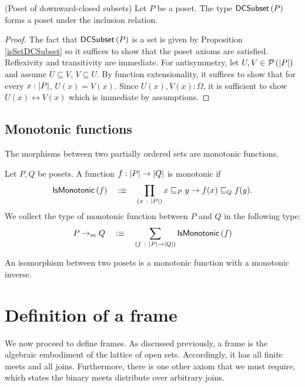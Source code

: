 \begin{thm}(Poset of downward-closed subsets)
  Let $P$ be a poset. The type $\mathsf{DCSubset}{}\left(P\right)$ forms a poset under the
  inclusion relation.
\end{thm}
\begin{proof}
  The fact that $\mathsf{DCSubset}{}\left(P\right)$ is a set is given by
  Proposition \ref{isSetDCSubset} so it suffices to show that the poset axioms are
  satisfied. Reflexivity and transitivity are immediate. For antisymmetry, let $U,
  V \in \mathcal{P}\left(\left| P \right|\right)$ and assume $U \subseteq V$, $V \subseteq U$. By function extensionality, it suffices
  to show that for every $x : \left| P \right|$, $U(x) = V(x)$. Since $U(x), V(x) : \Omega$, it is
  sufficient to show $U(x) \leftrightarrow V(x)$ which is immediate by assumptions.
\end{proof}

\subsection{Monotonic functions}

The morphisms between two partially ordered sets are monotonic functions.

\begin{defn}
  Let $P, Q$ be posets. A function $f : \left| P \right| \rightarrow \left| Q \right|$ is monotonic if
  \begin{equation*}
    \mathsf{IsMonotonic}{}\left(f\right) \quad:\equiv\quad \prod_{(x~:~\left| P \right|)} x \sqsubseteq_P y \rightarrow f(x) \sqsubseteq_Q f(y).
  \end{equation*}
  We collect the type of monotonic function between $P$ and $Q$ in the following type:
  \begin{equation*}
    P \rightarrow_m Q \quad:\equiv\quad \sum_{(f~:~\left| P \right| \rightarrow \left| Q \right|)} \mathsf{IsMonotonic}{}\left(f\right)
  \end{equation*}
\end{defn}

\begin{defn}
  An isomorphism between two posets is a monotonic function with a monotonic inverse.
\end{defn}

\section{Definition of a frame}\label{sec:frame}

We now proceed to define frames. As discussed previously, a frame is the algebraic
embodiment of the lattice of open sets. Accordingly, it has all finite meets and all
joins. Furthermore, there is one other axiom that we must require, which states the binary
meets distribute over arbitrary joins.

